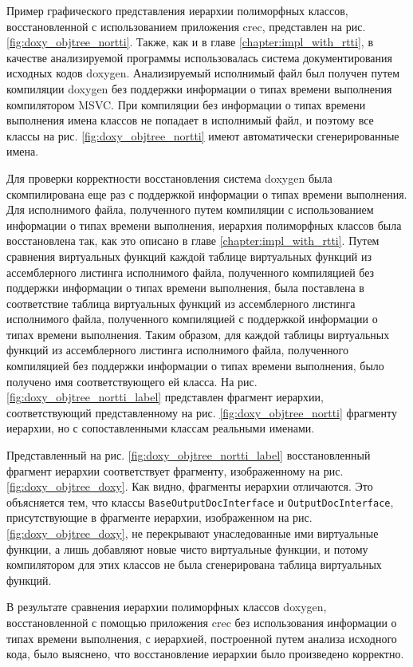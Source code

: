Пример графического представления иерархии полиморфных классов, восстановленной с использованием приложения crec, представлен на рис. \ref{fig:doxy_objtree_nortti}. Также, как и в главе \ref{chapter:impl_with_rtti}, в качестве анализируемой программы использовалась система документирования исходных кодов doxygen. Анализируемый исполнимый файл был получен путем компиляции doxygen без поддержки информации о типах времени выполнения компилятором MSVC. При компиляции без информации о типах времени выполнения имена классов не попадает в исполнимый файл, и поэтому все классы на рис. \ref{fig:doxy_objtree_nortti} имеют автоматически сгенерированные имена.

Для проверки корректности восстановления система doxygen была скомпилирована еще раз с поддержкой информации о типах времени выполнения. Для исполнимого файла, полученного путем компиляции с использованием информации о типах времени выполнения, иерархия полиморфных классов была восстановлена так, как это описано в главе \ref{chapter:impl_with_rtti}. Путем сравнения виртуальных функций каждой таблице виртуальных функций из ассемблерного листинга исполнимого файла, полученного компиляцией без поддержки информации о типах времени выполнения, была поставлена в соответствие таблица виртуальных функций из ассемблерного листинга исполнимого файла, полученного компиляцией с поддержкой информации о типах времени выполнения. Таким образом, для каждой таблицы виртуальных функций из ассемблерного листинга исполнимого файла, полученного компиляцией без поддержки информации о типах времени выполнения, было получено имя соответствующего ей класса. На рис. \ref{fig:doxy_objtree_nortti_label} представлен фрагмент иерархии, соответствующий представленному на рис. \ref{fig:doxy_objtree_nortti} фрагменту иерархии, но с сопоставленными классам реальными именами.

Представленный на рис. \ref{fig:doxy_objtree_nortti_label} восстановленный фрагмент иерархии соответствует фрагменту, изображенному на рис. \ref{fig:doxy_objtree_doxy}. Как видно, фрагменты иерархии отличаются. Это объясняется тем, что классы \lstinline{BaseOutputDocInterface} и \lstinline{OutputDocInterface}, присутствующие в фрагменте иерархии, изображенном на рис. \ref{fig:doxy_objtree_doxy}, не перекрывают унаследованные ими виртуальные функции, а лишь добавляют новые чисто виртуальные функции, и потому компилятором для этих классов не была сгенерирована таблица виртуальных функций.

В результате сравнения иерархии полиморфных классов doxygen, восстановленной с помощью приложения crec без использования информации о типах времени выполнения, с иерархией, построенной путем анализа исходного кода, было выяснено, что восстановление иерархии было произведено корректно.














